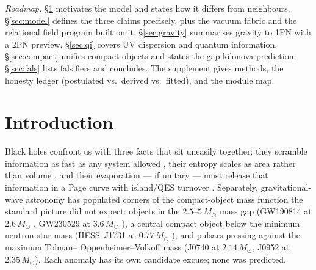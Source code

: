 \documentclass[11pt]{article}
\begin{document}
\begin{abstract}
law and the history measure filed as open debts; twenty-six follow-up campaigns
then close the substrate question per phenomenon (nothing requires uniquely
J2), characterise sources, domains, textures, and stability, split
event accounting into an earned deterministic update plus a missing
reservoir account that is exactly the lost inverse information, show a kept
record of that information makes merge reversible, narrow the substrate class
to exact rules with impossibility proofs, bank the large-$L$ asymptotics,
freeze the store with an event-local readout, census collapsed-region
multiplicity without an entropy law, and lift the fabric to a
quotient-cubic J3 whose repaired rulers read dimension 3 with a transfer
leg still open, then identify store information with the banked qubit
functional, earn the first area law for isolated boundary Q-information
at maximum density (doubly selected; thermodynamics still open), close
the dynamical-jet route, and show fixed-graph flow never forces
structural change. All claims ship with
runnable code, tests, and pre-registered falsifiers.
\end{abstract}

\noindent\textit{Roadmap.} \S\ref{sec:intro} motivates the model and states
how it differs from neighbours. \S\ref{sec:model} defines the three claims
precisely, plus the vacuum fabric and the relational field program built on
it. \S\ref{sec:gravity} summarises gravity to 1PN with a 2PN preview.
\S\ref{sec:qi} covers UV dispersion and quantum information.
\S\ref{sec:compact} unifies compact objects and states the gap-kilonova
prediction. \S\ref{sec:fals} lists falsifiers and concludes. The supplement
gives methods, the honesty ledger (postulated vs.\ derived vs.\ fitted), and
the module map.

\section{Introduction}
\label{sec:intro}

Black holes confront us with three facts that sit uneasily together: they
scramble information as fast as any system allowed
\cite{Sekino2008}, their entropy scales as area rather than volume
\cite{Bekenstein1973,Hawking1975}, and their evaporation --- if unitary ---
must release that information in a Page curve with island/QES turnover
\cite{Page1993,Penington2019,Almheiri2019}. Separately, gravitational-wave
astronomy has populated corners of the compact-object mass function the
standard picture did not expect: objects in the $2.5$--$5\,M_\odot$ mass gap
(GW190814 at $2.6\,M_\odot$ \cite{GW190814}, GW230529 at $3.6\,M_\odot$ \cite{GW230529}), a central compact
object below the minimum neutron-star mass (HESS~J1731 at $0.77\,M_\odot$
\cite{Doroshenko2022}), and pulsars pressing against the maximum Tolman--
Oppenheimer--Volkoff mass (J0740 at $2.14\,M_\odot$, J0952 at $2.35\,M_\odot$).
Each anomaly has its own candidate excuse; none was predicted.
\end{document}

